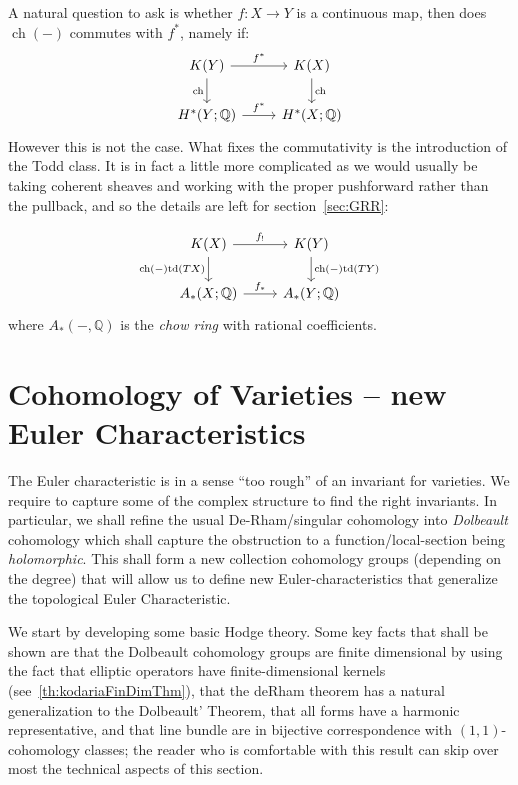 \documentclass{book}
\newcommand{\Q}{{\mathbb{Q}}}
\newcommand{\ch}{{\operatorname{ch}}}
\newcommand{\td}{{\operatorname{td}}}
\renewcommand{\ch}{{\operatorname{ch}}}
\begin{document}
A natural question to ask is whether $f: X \to Y$ is a continuous map, then does $\ch(-)$ commutes with $f^*$, namely
if:
\[
\begin{tikzcd}
K(Y) \arrow[r, "f^*"] \arrow[d, "\ch"'] & K(X) \arrow[d, "\ch"] \\
H^*(Y; \Q) \arrow[r, "f^*"]             & H^*(X; \Q)
\end{tikzcd}
\]
However this is not the case. What fixes the commutativity is the introduction of the Todd class. It is in
fact a little more complicated as we would usually be taking coherent sheaves and working with the
proper pushforward rather than the pullback, and so the details are left for section~\ref{sec:GRR}:

\[
\begin{tikzcd}
K(X) \arrow[r, "f_!"] \arrow[d, "\ch(-)\td(TX)"'] & K(Y) \arrow[d, "\ch(-)\td(TY)"] \\
A_*(X; \Q) \arrow[r, "f_*"]             & A_*(Y; \Q)
\end{tikzcd}
\]
where $A_*(-, \Q)$ is the \emph{chow ring} with rational coefficients.

\chapter{Cohomology of Varieties -- new Euler Characteristics}\label{cha:cohomVarieties}

The Euler characteristic is in a sense ``too rough'' of an invariant for varieties. We require to capture some
of the complex structure to find the right invariants. In particular, we shall refine the usual
De-Rham/singular cohomology into \emph{Dolbeault} cohomology which shall capture the obstruction to
a function/local-section being \emph{holomorphic}. This shall form a new collection cohomology groups (depending on
the degree) that will allow us to define new Euler-characteristics that generalize the topological Euler
Characteristic.

We start by developing some basic Hodge theory. Some key facts that shall be shown are that the Dolbeault
cohomology groups are finite dimensional by using the fact that elliptic operators have finite-dimensional
kernels (see~\cref{th:kodariaFinDimThm}), that the deRham theorem has a natural generalization to the
Dolbeault' Theorem, that all forms have a harmonic representative, and that line bundle are in bijective
correspondence with $(1,1)$-cohomology classes; the reader who is comfortable with this result can skip over
most the technical aspects of this section.
\end{document}
